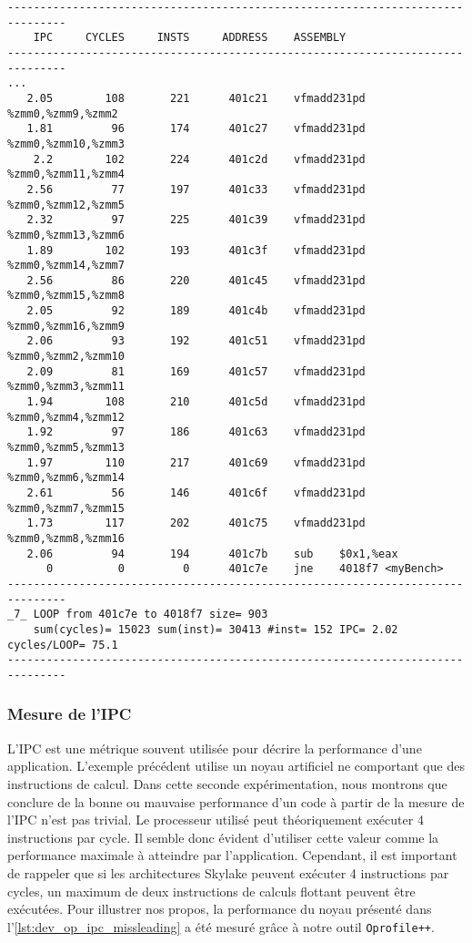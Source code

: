  \begin{lstlisting}[label=lst:dev_op_dependance_8_streams, caption=L'optimisation du noyau précedent permet de présenter au processeur 8 chaînes de calculs indépendantes.]
-------------------------------------------------------------------------------
    IPC     CYCLES     INSTS     ADDRESS    ASSEMBLY                         
-------------------------------------------------------------------------------
...
   2.05        108       221      401c21    vfmadd231pd %zmm0,%zmm9,%zmm2
   1.81         96       174      401c27    vfmadd231pd %zmm0,%zmm10,%zmm3
    2.2        102       224      401c2d    vfmadd231pd %zmm0,%zmm11,%zmm4
   2.56         77       197      401c33    vfmadd231pd %zmm0,%zmm12,%zmm5
   2.32         97       225      401c39    vfmadd231pd %zmm0,%zmm13,%zmm6
   1.89        102       193      401c3f    vfmadd231pd %zmm0,%zmm14,%zmm7
   2.56         86       220      401c45    vfmadd231pd %zmm0,%zmm15,%zmm8
   2.05         92       189      401c4b    vfmadd231pd %zmm0,%zmm16,%zmm9
   2.06         93       192      401c51    vfmadd231pd %zmm0,%zmm2,%zmm10
   2.09         81       169      401c57    vfmadd231pd %zmm0,%zmm3,%zmm11
   1.94        108       210      401c5d    vfmadd231pd %zmm0,%zmm4,%zmm12
   1.92         97       186      401c63    vfmadd231pd %zmm0,%zmm5,%zmm13
   1.97        110       217      401c69    vfmadd231pd %zmm0,%zmm6,%zmm14
   2.61         56       146      401c6f    vfmadd231pd %zmm0,%zmm7,%zmm15
   1.73        117       202      401c75    vfmadd231pd %zmm0,%zmm8,%zmm16
   2.06         94       194      401c7b    sub    $0x1,%eax
      0          0         0      401c7e    jne    4018f7 <myBench>
-------------------------------------------------------------------------------
_7_ LOOP from 401c7e to 4018f7 size= 903 
    sum(cycles)= 15023 sum(inst)= 30413 #inst= 152 IPC= 2.02 cycles/LOOP= 75.1
-------------------------------------------------------------------------------

\end{lstlisting}   




    \subsubsection{Mesure de l'IPC}
    
        L'IPC est une métrique souvent utilisée pour décrire la performance d'une application. L'exemple précédent utilise un noyau artificiel ne comportant que des instructions de calcul. Dans cette seconde expérimentation, nous montrons que conclure de la bonne ou mauvaise performance d'un code à partir de la mesure de l'IPC n'est pas trivial. Le processeur utilisé peut théoriquement exécuter 4 instructions par cycle. Il semble donc évident d'utiliser cette valeur comme la performance maximale à atteindre par l'application. Cependant, il est important de rappeler que si les architectures Skylake peuvent exécuter 4 instructions par cycles, un maximum de deux instructions de calculs flottant peuvent être exécutées. Pour illustrer nos propos, la performance du noyau présenté dans l'\autoref{lst:dev_op_ipc_missleading} a été mesuré grâce à notre outil \verb=Oprofile++=.

